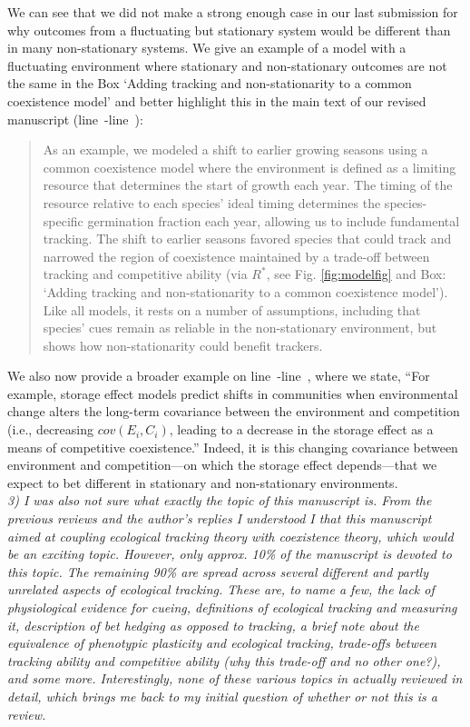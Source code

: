 \documentclass[11pt,letterpaper]{article}
\newcommand{\lr}[1]{line~\lineref{#1}}
\begin{document}
We can see that we did not make a strong enough case in our last submission for why outcomes from a fluctuating but stationary system would be different than in many non-stationary systems. We give an example of a model with a fluctuating environment where stationary and non-stationary outcomes are not the same in the Box `Adding tracking and non-stationarity to a common coexistence model' and better highlight this in the main text of our revised manuscript (\lr{r1dS1}-\lr{r1dE1}):
\begin{quote}
As an example, we modeled a shift to earlier growing seasons using a common coexistence model where the environment is defined as a limiting resource that determines the start of growth each year. The timing of the resource relative to each species' ideal timing determines the species-specific germination fraction each year, allowing us to include fundamental tracking. The shift to earlier seasons favored species that could track and narrowed the region of coexistence maintained by a trade-off between tracking and competitive ability (via $R^*$, see Fig. \ref{fig:modelfig} and Box: `Adding tracking and non-stationarity to a common coexistence model'). Like all models, it rests on a number of assumptions, including that species' cues remain as reliable in the non-stationary environment, but shows how non-stationarity could benefit trackers.
\end{quote}
We also now provide a broader example on \lr{r1dS}-\lr{r1dE}, where we state, ``For example, storage effect models predict shifts in communities when environmental change alters the long-term covariance between the environment and competition (i.e., decreasing $cov(E_i, C_i)$, leading to a decrease in the storage effect as a means of competitive coexistence.'' Indeed, it is this changing covariance between environment and competition---on which the storage effect depends---that we expect to bet different in stationary and non-stationary environments. \\

\emph{3) I was also not sure what exactly the topic of this manuscript is. From the previous
reviews and the author's replies I understood I that this manuscript aimed at coupling
ecological tracking theory with coexistence theory, which would be an exciting topic.
However, only approx. 10\% of the manuscript is devoted to this topic. The remaining 90\% are
spread across several different and partly unrelated aspects of ecological tracking. These
are, to name a few, the lack of physiological evidence for cueing, definitions of ecological
tracking and measuring it, description of bet hedging as opposed to tracking, a brief note
about the equivalence of phenotypic plasticity and ecological tracking, trade-offs between
tracking ability and competitive ability (why this trade-off and no other one?), and some
more. Interestingly, none of these various topics in actually reviewed in detail, which
brings me back to my initial question of whether or not this is a review.}\\
\end{document}
